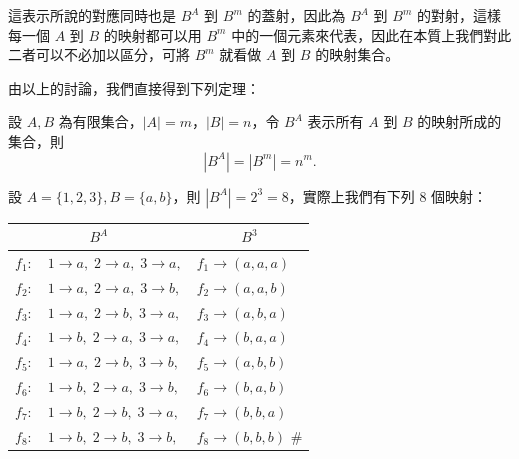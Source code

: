 這表示所說的對應同時也是 $B^A$ 到 $B^m$ 的蓋射，因此為 $B^A$ 到 $B^m$ 的對射，這樣每一個 $A$ 到 $B$ 的映射都可以用 $B^m$ 中的一個元素來代表，因此在本質上我們對此二者可以不必加以區分，可將 $B^m$ 就看做 $A$ 到 $B$ 的映射集合。

由以上的討論，我們直接得到下列定理：

\medskip
\begin{theorem}\label{thm:b5s-2-2}
設 $A, B$ 為有限集合，$|A| = m$，$|B| = n$，令 $B^A$ 表示所有 $A$ 到 $B$ 的映射所成的集合，則
\begin{equation}
|B^A| = |B^m| = n^m. \tag{8}
\end{equation}
\end{theorem}

\medskip
\begin{discussion}\label{disc:b5s-2-1}
設 $A=\{1, 2, 3\}, B=\{a, b\}$，則 $|B^A| = 2^3 = 8$，實際上我們有下列 8 個映射：

\begin{center}
\renewcommand{\arraystretch}{1.2}
\begin{tabular}{r@{\quad}l@{\quad}|@{\quad}l}
\multicolumn{2}{c|}{$B^A$} & \multicolumn{1}{c}{$B^3$} \\ \hline
$f_1 :$ & $1 \longrightarrow a,\; 2 \longrightarrow a,\; 3 \longrightarrow a,$ & $f_1 \longrightarrow (a, a, a)$ \\
$f_2 :$ & $1 \longrightarrow a,\; 2 \longrightarrow a,\; 3 \longrightarrow b,$ & $f_2 \longrightarrow (a, a, b)$ \\
$f_3 :$ & $1 \longrightarrow a,\; 2 \longrightarrow b,\; 3 \longrightarrow a,$ & $f_3 \longrightarrow (a, b, a)$ \\
$f_4 :$ & $1 \longrightarrow b,\; 2 \longrightarrow a,\; 3 \longrightarrow a,$ & $f_4 \longrightarrow (b, a, a)$ \\
$f_5 :$ & $1 \longrightarrow a,\; 2 \longrightarrow b,\; 3 \longrightarrow b,$ & $f_5 \longrightarrow (a, b, b)$ \\
$f_6 :$ & $1 \longrightarrow b,\; 2 \longrightarrow a,\; 3 \longrightarrow b,$ & $f_6 \longrightarrow (b, a, b)$ \\
$f_7 :$ & $1 \longrightarrow b,\; 2 \longrightarrow b,\; 3 \longrightarrow a,$ & $f_7 \longrightarrow (b, b, a)$ \\
$f_8 :$ & $1 \longrightarrow b,\; 2 \longrightarrow b,\; 3 \longrightarrow b,$ & $f_8 \longrightarrow (b, b, b)$ \hfill $\#$
\end{tabular}
\end{center}
\end{discussion}

